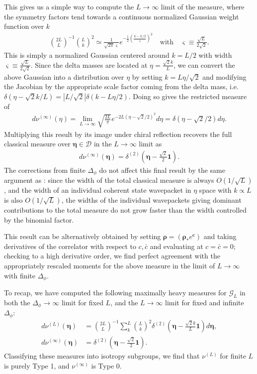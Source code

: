 \documentclass[a4paper,11pt]{article}
\theoremstyle{plain}
\theoremstyle{definition}
\theoremstyle{remark}
\newcommand{\bs}[1]{\boldsymbol{#1}}
\newcommand{\ba}{\begin{equation} \begin{aligned}}
\newcommand{\ea}{\end{aligned} \end{equation}}
\newcommand{\Df}{\Delta_\phi}
\begin{document}
This gives us a simple way to compute the $L \to \infty$ limit of the measure, where the symmetry factors tend towards a continuous normalized Gaussian weight function over $k$
\ba
\label{binomweightapprox}
\binom{2L}{L}^{-1} \binom{L}{k}^2 \simeq \frac{1}{\sqrt{2 \pi} \varsigma} e^{-\frac{1}{2} \left(\frac{k - L/2}{\varsigma} \right)^2} \quad \text{with}\quad \varsigma \equiv \frac{\sqrt{L}}{2\sqrt{2}}.
\ea
This is simply a normalized Gaussian centered around $k = L/2$ with width $\varsigma \equiv \frac{\sqrt{L}}{2\sqrt{2}}$. Since the delta masses are located at $\eta = \frac{\sqrt{2}k}{L}$, we can convert the above Gaussian into a distribution over $\eta$ by setting $ k = L \eta /\sqrt{2}$ and modifying the Jacobian by the appropriate scale factor coming from the delta mass, i.e.~$\delta(\eta - \sqrt{2}k/L) = |L/\sqrt{2}| \delta(k- L \eta /2)$. Doing so gives the restricted measure of
\ba
d\nu^{(\infty)}(\eta) = \lim_{L \to \infty} \sqrt{\frac{2 L}{\pi}} e^{-2L ( \eta - \sqrt{2}/2)^2} d\eta = \delta(\eta - \sqrt{2}/2) d\eta.
\ea
Multiplying this result by its image under chiral reflection recovers the full classical measure over $\bs{\eta} \in \mathcal{D}$ in the $L \to \infty$ limit as
\ba
d\nu^{(\infty)} (\bs{\eta}) = \delta^{(2)}\left(\bs{\eta} - \frac{\sqrt{2}}{2} \bs{1}\right).
\ea
The corrections from finite $\Df$ do not affect this final result by the same argument as \cite{Poland:2024hvb}: since the width of the total classical measure is always $O(1/\sqrt{L})$, and the width of an individual coherent state wavepacket in $\eta$ space with $k \propto L$ is also $O(1/\sqrt{L})$, the widths of the individual wavepackets giving dominant contributions to the total measure do not grow faster than the width controlled by the binomial factor.

This result can be alternatively obtained by setting $\bs{\rho} = (\bs{\rho}_* e^{\bs{c}})$ and taking derivatives of the correlator with respect to $c,\bar{c}$ and evaluating at $c = \bar{c} = 0$; checking to a high derivative order, we find perfect agreement with the appropriately rescaled moments for the above  measure in the limit of $L \to \infty$ with finite $\Df$. 

To recap, we have computed the following maximally heavy measures for $\mathcal{G}_L$ in both the $\Df \to \infty$ limit for fixed $L$, and the $L \to \infty$ limit for fixed and infinite $\Df$:
\ba
\label{classicalmeasuresGFF}
d\nu^{(L)}(\bs{\eta}) &= \binom{2L}{L}^{-1} \sum_k^L  \binom{L}{k}^2\delta^{(2)}\left(\bs{\eta}- \frac{\sqrt{2} k}{L}\bs{1} \right) d\bs{\eta},\\
d\nu^{(\infty)} (\bs{\eta}) &= \delta^{(2)}\left(\bs{\eta} - \frac{\sqrt{2}}{2} \bs{1}\right).
\ea
Classifying these measures into isotropy subgroups, we find that $\nu^{(L)}$ for finite $L$ is purely Type 1, and $\nu^{(\infty)}$ is Type 0. 
\end{document}
